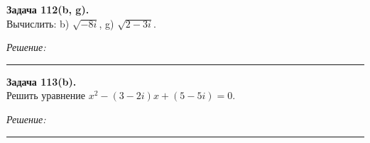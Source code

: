 \documentclass[a4paper, 12pt]{article}
\newenvironment{problem}[2][Задача]
    { \begin{mdframed}[backgroundcolor=gray!10] \textbf{#1 #2.} \\}
    {  \end{mdframed}}
\newenvironment{solution}
    {\textit{Решение: }}
    {\noindent\rule{7in}{1.5pt}}
\begin{document}
\begin{problem}{112(b, g)}
Вычислить: b) $\sqrt{-8i}$, g) $\sqrt{2-3i}$.
\end{problem}
\begin{solution}


\end{solution} 


\begin{problem}{113(b)}
Решить уравнение $x^2-(3-2i)x+(5-5i)=0$.
\end{problem}
\begin{solution}


\end{solution} 

\end{document}
